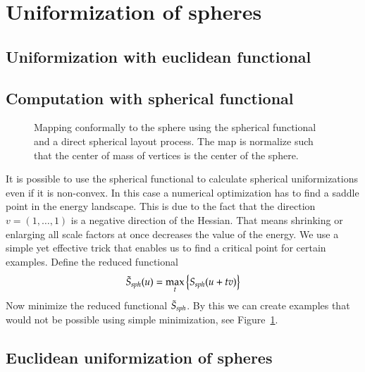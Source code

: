 \documentclass[Thesis.tex]{subfiles}
\begin{document}
\section{Uniformization of spheres}
\subsection{Uniformization with euclidean functional}
\label{sec:spheres_euclidean}

\subsection{Computation with spherical functional}

\begin{figure}
\centering
{}
\quad\quad\quad{}
\caption{Mapping conformally to the sphere using the spherical functional and a direct spherical layout process. The map is normalize such that the center of mass of vertices is the center of the sphere.}
\label{fig:spherical_examples}
\end{figure}

It is possible to use the spherical functional to calculate spherical uniformizations even if it is non-convex. In this case a numerical optimization has to find a saddle point in the energy landscape. This is due to the fact that the direction $v=(1,\ldots,1)$ is a negative direction of the Hessian. That means shrinking or enlarging all scale factors at once decreases the value of the energy. We use a simple yet effective trick that enables us to find a critical point for certain examples. Define the reduced functional
\begin{equation}
\label{eq:reduced_spherical}
\tilde S_{\it sph}(u)=\max_t \left\{S_{\it sph}(u + tv)\right\}
\end{equation}
Now minimize the reduced functional $\tilde  S_{\it sph}$. By this we can create examples that would not be possible using simple minimization, see Figure~\ref{fig:spherical_examples}.

\subsection{Euclidean uniformization of spheres}
\end{document}
